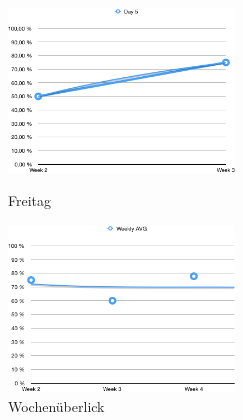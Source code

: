 \begin{figure}[t!]
    \centering
    \parbox{6cm}{
    \includegraphics[width=6cm]{./Abbildungen/Kapitel_04/usr1day5.png}
    \caption{Freitag}
    \label{usr1day5}}
    \qquad
    \begin{minipage}{6cm}
    \includegraphics[width=6cm]{./Abbildungen/Kapitel_04/usr1wa.png}
    \caption{Wochenüberlick}
    \label{usr1wa}
    \end{minipage}
\end{figure}
    


\clearpage
\newpage

